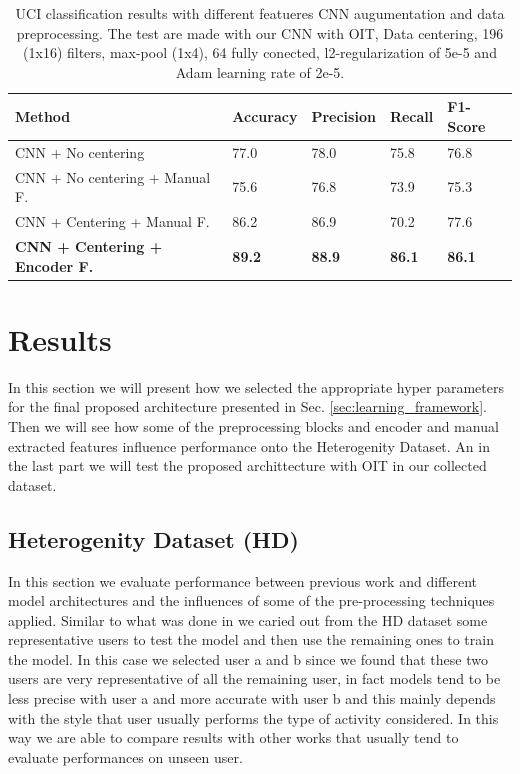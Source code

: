 
\begin{table}[t]
	\begin{center}
		\begin{tabular}{ p{7cm}p{2cm}p{2cm}p{2cm}p{2cm} }
			\hline
			Method & Accuracy & Precision & Recall & F1-Score \\
			\hline
			CNN + No centering & 77.0 & 78.0 & 75.8 & 76.8 \\
			CNN + No centering + Manual F. & 75.6 & 76.8 & 73.9 & 75.3 \\
			CNN + Centering + Manual F. & 86.2 & 86.9 & 70.2 & 77.6 \\
			\textbf{CNN + Centering + Encoder F.} & \textbf{89.2} & \textbf{88.9} &  \textbf{86.1} & \textbf{86.1} \\
			\hline
		\end{tabular}
		\caption{\label{tab:model-performance} UCI classification results with different featueres CNN augumentation and data preprocessing. The test are made with our CNN with OIT, Data centering, 196 (1x16) filters, max-pool (1x4), 64 fully conected, l2-regularization of 5e-5 and Adam learning rate of 2e-5.}
	\end{center}
\end{table}

\section{Results}
\label{sec:results}
In this section we will present how we selected the appropriate hyper parameters for the final proposed architecture presented in Sec. \ref{sec:learning_framework}. Then we will see how some of the preprocessing blocks and encoder and manual extracted features influence performance onto the Heterogenity Dataset. An in the last part we will test the proposed archittecture with OIT in our collected dataset.

\subsection{Heterogenity Dataset (HD)}

In this section we evaluate performance between previous work and different model architectures and the influences of some of the pre-processing techniques applied. Similar to what was done in \cite{ignatov2018real} we caried out from the HD dataset some representative users to test the model and then use the remaining ones to train the model. In this case we selected user a and b since we found that these two users are very representative of all the remaining user, in fact models tend to be less precise with user a and more accurate with user b and this mainly depends with the style that user usually performs the type of activity considered. In this way we are able to compare results with other works that usually tend to evaluate performances on unseen user.

